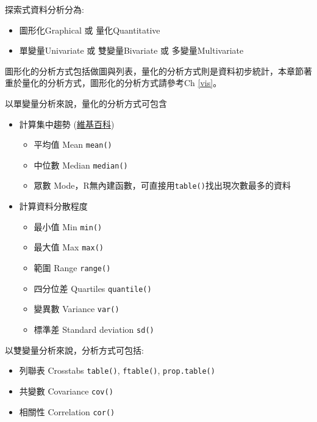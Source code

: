 \documentclass[]{book}
\providecommand{\tightlist}{%
  \setlength{\itemsep}{0pt}\setlength{\parskip}{0pt}}
\theoremstyle{definition}
\theoremstyle{definition}
\theoremstyle{remark}
\begin{document}
探索式資料分析分為:

\begin{itemize}
\tightlist
\item
  圖形化Graphical 或 量化Quantitative
\item
  單變量Univariate 或 雙變量Bivariate 或 多變量Multivariate
\end{itemize}

圖形化的分析方式包括做圖與列表，量化的分析方式則是資料初步統計，本章節著重於量化的分析方式，圖形化的分析方式請參考Ch
\ref{vis}。

以單變量分析來說，量化的分析方式可包含

\begin{itemize}
\tightlist
\item
  計算集中趨勢
  (\href{https://zh.wikipedia.org/wiki/\%E9\%9B\%86\%E4\%B8\%AD\%E8\%B6\%8B\%E5\%8A\%BF}{維基百科})

  \begin{itemize}
  \tightlist
  \item
    平均值 Mean \texttt{mean()}
  \item
    中位數 Median \texttt{median()}
  \item
    眾數 Mode，R無內建函數，可直接用\texttt{table()}找出現次數最多的資料
  \end{itemize}
\item
  計算資料分散程度

  \begin{itemize}
  \tightlist
  \item
    最小值 Min \texttt{min()}
  \item
    最大值 Max \texttt{max()}
  \item
    範圍 Range \texttt{range()}
  \item
    四分位差 Quartiles \texttt{quantile()}
  \item
    變異數 Variance \texttt{var()}
  \item
    標準差 Standard deviation \texttt{sd()}
  \end{itemize}
\end{itemize}

以雙變量分析來說，分析方式可包括:

\begin{itemize}
\tightlist
\item
  列聯表 Crosstabs \texttt{table()}, \texttt{ftable()},
  \texttt{prop.table()}
\item
  共變數 Covariance \texttt{cov()}
\item
  相關性 Correlation \texttt{cor()}
\end{itemize}
\end{document}
